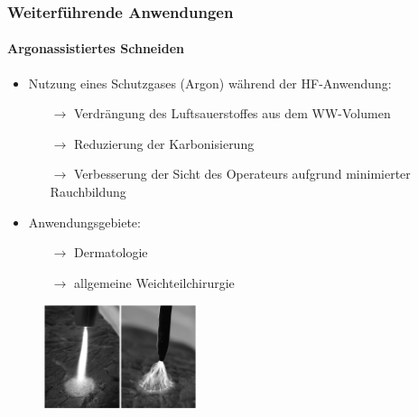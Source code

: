 \documentclass{beamer}
\begin{document}
\begin{frame}
\frametitle{Weiterführende Anwendungen}
\framesubtitle{Argonassistiertes Schneiden}
\begin{itemize}
	\item Nutzung eines Schutzgases (Argon) während der HF-Anwendung:
	\begin{itemize}
		\item [$\rightarrow$]Verdrängung des Luftsauerstoffes aus dem WW-Volumen
		\item [$\rightarrow$]Reduzierung der Karbonisierung
		\item [$\rightarrow$]Verbesserung der Sicht des Operateurs aufgrund minimierter Rauchbildung
	\end{itemize}
	\vspace{0.2cm}
	\item Anwendungsgebiete: 
	\begin{itemize}
		\item [$\rightarrow$] Dermatologie
		\item [$\rightarrow$] allgemeine Weichteilchirurgie
	\end{itemize}
\end{itemize}
\begin{figure}
	\centering
	\includegraphics[width=4.5cm]{images/argon.png}
	\cite{kramme2016medizintechnik}
\end{figure}
\end{frame}
\end{document}
